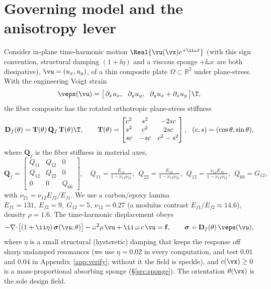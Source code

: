 \section{Governing model and the anisotropy lever}
\label{sec:model}
Consider in-plane time-harmonic motion $\Real\{\vu(\vx)e^{+\ii\omega t}\}$ (with this sign convention, structural damping $(1+\ii\eta)$ and a viscous sponge $+\ii\omega c$ are both dissipative),
$\vu=(u_x,u_y)$, of a thin composite plate $\Omega\subset\mathbb R^2$ under
plane-stress. With the engineering Voigt strain
\begin{equation}
  \veps(\vu)=\bigl[\,\partial_x u_x,\ \ \partial_y u_y,\ \
  \partial_y u_x+\partial_x u_y\,\bigr]\T,
\end{equation}
the fiber composite has the rotated orthotropic plane-stress stiffness
\begin{equation}
  \mathbf D_f(\theta)=\mathbf T(\theta)\,\mathbf Q_f\,\mathbf T(\theta)\T,\qquad
  \mathbf T(\theta)=\begin{bmatrix} c^2 & s^2 & -2sc\\ s^2 & c^2 & 2sc\\
  sc & -sc & c^2-s^2\end{bmatrix},\ \ (c,s)=(\cos\theta,\sin\theta),
  \label{eq:Df}
\end{equation}
where $\mathbf Q_f$ is the fiber stiffness in material axes,
\begin{equation}
  \mathbf Q_f=\begin{bmatrix} Q_{11}&Q_{12}&0\\ Q_{12}&Q_{22}&0\\
  0&0&Q_{66}\end{bmatrix},\quad
  Q_{11}=\tfrac{E_{f1}}{1-\nu_{12}\nu_{21}},\ \
  Q_{22}=\tfrac{E_{f2}}{1-\nu_{12}\nu_{21}},\ \
  Q_{12}=\tfrac{\nu_{12}E_{f2}}{1-\nu_{12}\nu_{21}},\ \ Q_{66}=G_{12},
\end{equation}
with $\nu_{21}=\nu_{12}E_{f2}/E_{f1}$. We use a carbon/epoxy lamina
$E_{f1}=131,\ E_{f2}=9,\ G_{12}=5,\ \nu_{12}=0.27$ (a modulus contrast
$E_{f1}/E_{f2}\approx14.6$), density $\rho=1.6$. The time-harmonic displacement
obeys
\begin{equation}
  -\nabla\!\cdot\!\bigl[(1+\ii\eta)\,\bm\sigma(\vu;\theta)\bigr]
  -\omega^2\rho\,\vu+\ii\,\omega\,c\,\vu=\mathbf f,\qquad
  \bm\sigma=\mathbf D_f(\theta)\,\veps(\vu),
  \label{eq:strong}
\end{equation}
where $\eta$ is a small structural (hysteretic) damping that keeps the response
off sharp undamped resonances (we use $\eta=0.02$ in every computation, and test $0.01$ and $0.04$ in
Appendix~\ref{app:verify}; without it the field is
speckle), and $c(\vx)\ge0$ is a mass-proportional absorbing sponge
(\S\ref{sec:sponge}). The orientation $\theta(\vx)$ is the sole design field.


